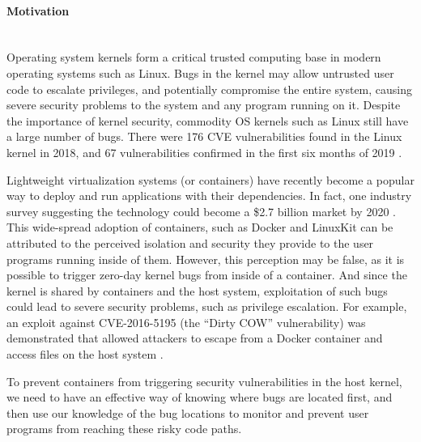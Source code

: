 \paragraph{Motivation}\mbox{}\\

Operating system kernels form a critical trusted computing base in modern operating systems such as Linux.  
Bugs in the kernel may allow untrusted user code to escalate privileges, and potentially compromise the entire system, causing severe security problems to the system and any program running on it. 
Despite the importance of kernel security, commodity OS kernels such as Linux still have a large number of bugs. There were 176 CVE vulnerabilities found in the Linux kernel in 2018, and 67 vulnerabilities 
confirmed in the first six months of 2019 \cite{kernel_cves}. 

Lightweight virtualization systems (or containers) have recently become a popular way to deploy and run applications with their dependencies. 
In fact, one industry survey suggesting the technology could become a \$2.7 billion market by 2020 \cite{451-Research}.  
This wide-spread adoption of containers, such as Docker \cite{Docker} and LinuxKit \cite{LinuxKit} can be attributed to 
the perceived isolation and security they provide to the user programs running inside of them. 
However, this perception may be false, as it is possible to trigger zero-day kernel bugs from inside of a container. 
And since the kernel is shared by containers and the host system, exploitation of such bugs could lead to severe security problems, 
such as privilege escalation. For example, an exploit against CVE-2016-5195 (the “Dirty COW” vulnerability) was demonstrated that 
allowed attackers to escape from a Docker container and access files on the host system \cite{Dirty_COW}. 

To prevent containers from triggering security vulnerabilities in the host kernel, we need to have an effective way of knowing where bugs are located first, and then 
use our knowledge of the bug locations to monitor and prevent user programs from reaching these risky code paths. 